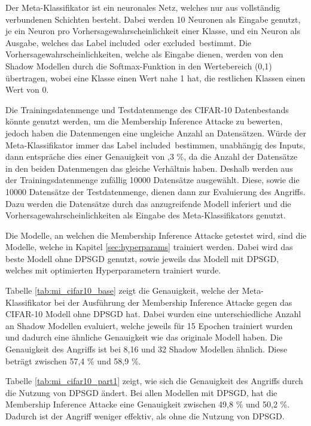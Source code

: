Der Meta-Klassifikator ist ein neuronales Netz, welches nur aus vollständig verbundenen Schichten besteht.
Dabei werden 10 Neuronen als Eingabe genutzt, je ein Neuron pro Vorhersagewahrscheinlichkeit einer Klasse, und ein Neuron als Ausgabe, welches das Label \dq included\dq\ oder \dq excluded\dq\ bestimmt.
Die Vorhersagewahrscheinlichkeiten, welche als Eingabe dienen, werden von den Shadow Modellen durch die Softmax-Funktion in den Wertebereich (0,1) übertragen, wobei eine Klasse einen Wert nahe 1 hat, die restlichen Klassen einen Wert von 0.

Die Trainingsdatenmenge und Testdatenmenge des CIFAR-10 Datenbestands könnte genutzt werden, um die Membership Inference Attacke zu bewerten, jedoch haben die Datenmengen eine ungleiche Anzahl an Datensätzen.
Würde der Meta-Klassifikator immer das Label \dq included\dq\ bestimmen, unabhängig des Inputs, dann entspräche dies einer Genauigkeit von ,3 \%, da die Anzahl der Datensätze in den beiden Datenmengen das gleiche Verhältnis haben.
Deshalb werden aus der Trainingsdatenmenge zufällig 10000 Datensätze ausgewählt. Diese, sowie die 10000 Datensätze der Testdatenmenge, dienen dann zur Evaluierung des Angriffs.
Dazu werden die Datensätze durch das anzugreifende Modell inferiert und die Vorhersagewahrscheinlichkeiten als Eingabe des Meta-Klassifikators genutzt.

Die Modelle, an welchen die Membership Inference Attacke getestet wird, sind die Modelle, welche in Kapitel \ref{sec:hyperparams} trainiert werden.
Dabei wird das beste Modell ohne DPSGD genutzt, sowie jeweils das Modell mit DPSGD, welches mit optimierten Hyperparametern trainiert wurde.

Tabelle \ref{tab:mi_cifar10_base} zeigt die Genauigkeit, welche der Meta-Klassifikator bei der Ausführung der Membership Inference Attacke gegen das CIFAR-10 Modell ohne DPSGD hat.
Dabei wurden eine unterschiedliche Anzahl an Shadow Modellen evaluiert, welche jeweils für 15 Epochen trainiert wurden und dadurch eine ähnliche Genauigkeit wie das originale Modell haben.
Die Genauigkeit des Angriffs ist bei 8,16 und 32 Shadow Modellen ähnlich.
Diese beträgt zwischen 57,4 \% und 58,9 \%.


Tabelle \ref{tab:mi_cifar10_part1} zeigt, wie sich die Genauigkeit des Angriffs durch die Nutzung von DPSGD ändert.
Bei allen Modellen mit DPSGD, hat die Membership Inference Attacke eine Genauigkeit zwischen 49,8 \% und 50,2 \%. 
Dadurch ist der Angriff weniger effektiv, als ohne die Nutzung von DPSGD.


